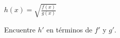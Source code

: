 \item $\displaystyle h(x) = \sqrt{\frac{f(x)}{g(x)}}$
\par
Encuentre $h'$ en términos de $f'$ y $g'$.
